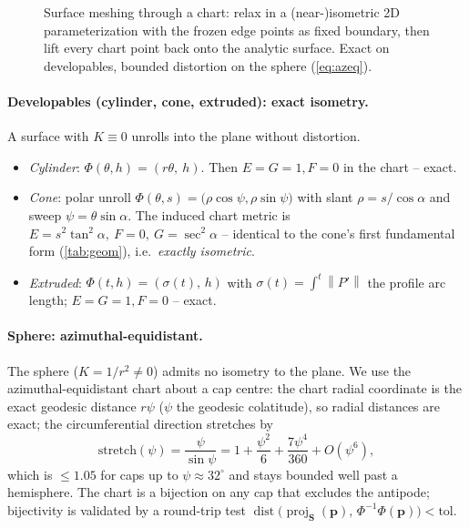 \documentclass[11pt,a4paper]{article}
\numberwithin{equation}{section}
\newcommand{\norm}[1]{\left\lVert #1 \right\rVert}
\newcommand{\vv}[1]{\mathbf{#1}}
\DeclareMathOperator{\proj}{proj}
\DeclareMathOperator{\dist}{dist}
\begin{document}
\begin{figure}[H]\centering
{}
\caption{Surface meshing through a chart: relax in a (near-)isometric 2D
parameterization with the frozen edge points as fixed boundary, then lift every
chart point back onto the analytic surface. Exact on developables, bounded
distortion on the sphere (\cref{eq:azeq}).}
\label{fig:chart}
\end{figure}

\paragraph{Developables (cylinder, cone, extruded): exact isometry.}
A surface with $K\equiv0$ unrolls into the plane without distortion.
\begin{itemize}[topsep=2pt,itemsep=1pt]
\item \emph{Cylinder}: $\Phi(\theta,h)=(r\theta,\ h)$. Then $E=G=1,F=0$ in the
chart -- exact.
\item \emph{Cone}: polar unroll $\Phi(\theta,s)=\bigl(\rho\cos\psi,\rho\sin\psi
\bigr)$ with slant $\rho=s/\cos\alpha$ and sweep $\psi=\theta\sin\alpha$. The
induced chart metric is $E=s^2\tan^2\alpha,\ F=0,\ G=\sec^2\alpha$ -- identical
to the cone's first fundamental form (\cref{tab:geom}), i.e.\ \emph{exactly
isometric}.
\item \emph{Extruded}: $\Phi(t,h)=(\sigma(t),\,h)$ with $\sigma(t)=\int^t\norm
{P'}$ the profile arc length; $E=G=1,F=0$ -- exact.
\end{itemize}

\paragraph{Sphere: azimuthal-equidistant.}
The sphere ($K=1/r^2\neq0$) admits no isometry to the plane. We use the
azimuthal-equidistant chart about a cap centre: the chart radial coordinate is
the exact geodesic distance $r\psi$ ($\psi$ the geodesic colatitude), so radial
distances are exact; the circumferential direction stretches by
\begin{equation}
\label{eq:azeq}
\text{stretch}(\psi)=\frac{\psi}{\sin\psi}
   = 1+\frac{\psi^2}{6}+\frac{7\psi^4}{360}+O(\psi^6),
\end{equation}
which is $\le 1.05$ for caps up to $\psi\approx 32^\circ$ and stays bounded
well past a hemisphere. The chart is a bijection on any cap that excludes the
antipode; bijectivity is validated by a round-trip test
$\dist\!\bigl(\proj_{\vv{S}}(\vv{p}),\,\Phi^{-1}\Phi(\vv{p})\bigr)<\text{tol}$.
\end{document}
